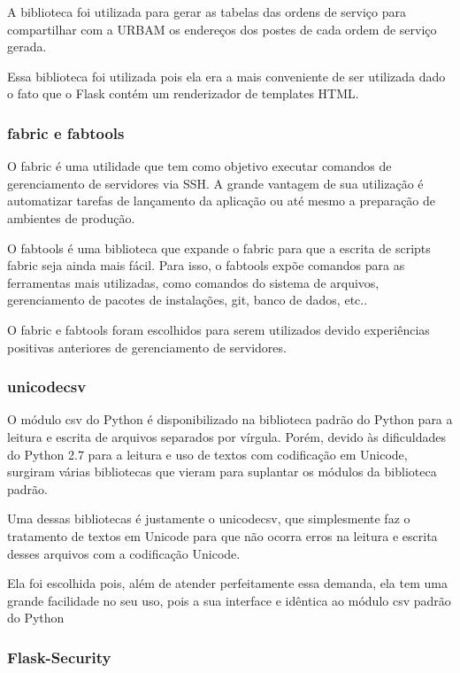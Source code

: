 \documentclass[
	article,			%
	11pt,				%
	oneside,			%
	a4paper,			%
	english,			%
	brazil,				%
	sumario=tradicional
	]{abntex2}
\begin{document}
A biblioteca foi utilizada para gerar as tabelas das ordens de serviço para
compartilhar com a URBAM os endereços dos postes de cada ordem de serviço gerada.

Essa biblioteca foi utilizada pois ela era a mais conveniente de ser utilizada
dado o fato que o Flask contém um renderizador de templates HTML.

\subsubsection{fabric e fabtools}

O fabric é uma utilidade que tem como objetivo executar comandos de
gerenciamento de servidores via SSH. A grande vantagem de sua utilização é
automatizar tarefas de lançamento da aplicação ou até mesmo a preparação de
ambientes de produção.\cite{fabric}

O fabtools é uma biblioteca que expande o fabric para que a escrita de scripts
fabric seja ainda mais fácil. Para isso, o fabtools expõe comandos para as
ferramentas mais utilizadas, como comandos do sistema de arquivos, gerenciamento
de pacotes de instalações, git, banco de dados, etc.. \cite{fabtools}

O fabric e fabtools foram escolhidos para serem utilizados devido experiências
positivas anteriores de gerenciamento de servidores.

\subsubsection{unicodecsv}

O módulo csv do Python é disponibilizado na biblioteca padrão do Python para a
leitura e escrita de arquivos separados por vírgula. Porém, devido às
dificuldades do Python 2.7 para a leitura e uso de textos com codificação em
Unicode, surgiram várias bibliotecas que vieram para suplantar os módulos da
biblioteca padrão.

Uma dessas bibliotecas é justamente o unicodecsv, que simplesmente faz o
tratamento de textos em Unicode para que não ocorra erros na leitura e escrita
desses arquivos com a codificação Unicode. \cite{unicodecsv}

Ela foi escolhida pois, além de atender perfeitamente essa demanda, ela tem
uma grande facilidade no seu uso, pois a sua interface e idêntica ao módulo
csv padrão do Python

\subsubsection{Flask-Security}
\end{document}
